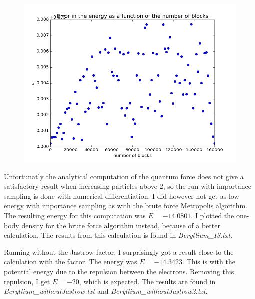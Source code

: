 \documentclass[a4paper, 12pt, titlepage]{article}
\begin{document}
 \begin{figure}
 	\centering
 	\includegraphics[width=\textwidth]{../python_programs/BerylliumBlocking.png}
 \end{figure}


 Unfortunatly the analytical computation of the quantum force does not give a satisfactory result when increasing particles above $2$, so the run with importance sampling is done with numerical differentiation. I did however not get as low energy with importance sampling as with the brute force Metropolis algorithm. The resulting energy for this computation was $E = -14.0801$. I plotted the one-body density for the brute force algorithm instead, because of a better calculation. The results from this calculation is found in \textit{Beryllium\_IS.txt}. 

 Running without the Jastrow factor, I surprisingly got a result close to the calculation with the factor. The energy was $E = -14.3423$. This is with the potential energy due to the repulsion between the electrons. Removing this repulsion, I get $E = -20$, which is expected. The results are found in \textit{Beryllium\_withoutJastrow.txt} and \textit{Beryllium\_withoutJastrow2.txt}. 
 


 
\end{document}
